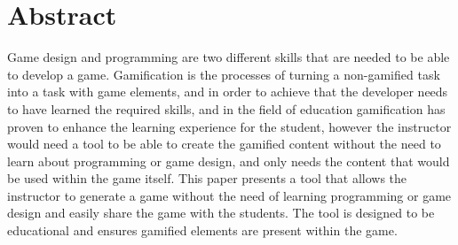 \chapter*{Abstract}
\label{chap:abstract}

Game design and programming are two different skills that are needed to be able to develop a game. Gamification is the processes of turning a non-gamified task into a task with game elements, and in order to achieve that the developer needs to have learned the required skills, and in the field of education gamification has proven to enhance the learning experience for the student, however the instructor would need a tool to be able to create the gamified content without the need to learn about programming or game design, and only needs the content that would be used within the game itself. This paper presents a tool that allows the instructor to generate a game without the need of learning programming or game design and easily share the game with the students. The tool is designed to be educational and ensures gamified elements are present within the game.
